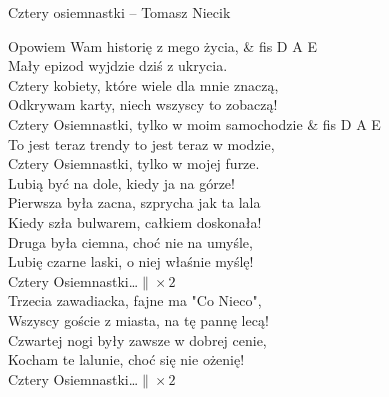 \begin{piosenka}{Cztery osiemnastki -- Tomasz Niecik}

Opowiem Wam historię z mego życia, & fis D A E \\
Mały epizod wyjdzie dziś z ukrycia. \\
Cztery kobiety, które wiele dla mnie znaczą, \\
Odkrywam karty, niech wszyscy to zobaczą! \\[\zwrotkaspace]

 Cztery Osiemnastki, tylko w moim samochodzie & fis D A E \\
 To jest teraz trendy to jest teraz w modzie, \\
 Cztery Osiemnastki, tylko w mojej furze. \\
 Lubią być na dole, kiedy ja na górze! \\[\zwrotkaspace]

Pierwsza była zacna, szprycha jak ta lala \\
Kiedy szła bulwarem, całkiem doskonała! \\
Druga była ciemna, choć nie na umyśle, \\
Lubię czarne laski, o niej właśnie myślę! \\[\zwrotkaspace]

 Cztery Osiemnastki\ldots $\| \times 2$ \\[\zwrotkaspace]

Trzecia zawadiacka, fajne ma "Co Nieco", \\
Wszyscy goście z miasta, na tę pannę lecą! \\
Czwartej nogi były zawsze w dobrej cenie, \\
Kocham te lalunie, choć się nie ożenię! \\[\zwrotkaspace]

 Cztery Osiemnastki\ldots $\| \times 2$ \\[\zwrotkaspace]

\end{piosenka}